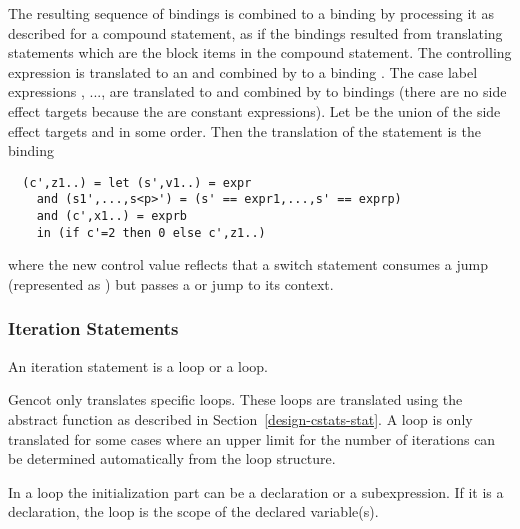 The resulting sequence of bindings  is combined to a binding  by processing it as described 
for a compound statement, as if the bindings resulted from translating statements which are the block items in the compound 
statement. The controlling expression  is translated to an  and combined by  to a binding
. The case label expressions , ...,  are translated to  and combined by
 to bindings  (there are no side effect targets because the  are constant expressions). 
Let  be the union of the side effect 
targets  and  in some order. Then the translation of the  statement is the binding
\begin{verbatim}
  (c',z1..) = let (s',v1..) = expr
    and (s1',...,s<p>') = (s' == expr1,...,s' == exprp)
    and (c',x1..) = exprb
    in (if c'=2 then 0 else c',z1..)
\end{verbatim}
where the new control value reflects that a switch statement consumes a  jump (represented as ) but passes a
 or  jump to its context.

\subsubsection{Iteration Statements}

An iteration statement is a  loop or a  loop.

Gencot only translates specific  loops. These loops are translated using the abstract function  as described
in Section~\ref{design-cstats-stat}. A  loop is only translated for some cases where an upper limit for the number of 
iterations can be determined automatically from the loop structure.

In a  loop the initialization part can be a declaration or a subexpression. If it is a declaration, the  loop
is the scope of the declared variable(s).

